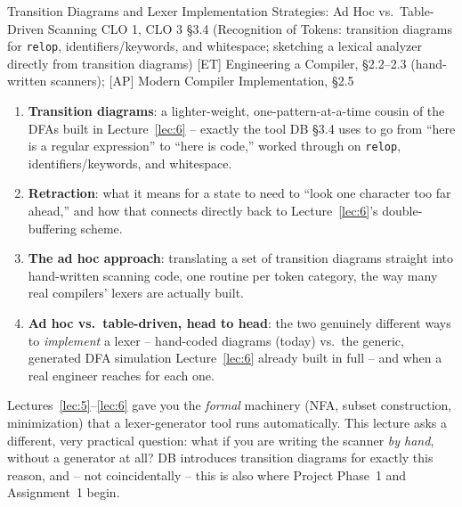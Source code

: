 \documentclass[full-course-notes.tex]{subfiles}
\begin{document}
  {Transition Diagrams and Lexer Implementation Strategies: Ad Hoc vs.\ Table-Driven Scanning}
  {CLO 1, CLO 3}
  {\S3.4 (Recognition of Tokens: transition diagrams for \texttt{relop}, identifiers/keywords,
   and whitespace; sketching a lexical analyzer directly from transition diagrams)}
  {[ET] Engineering a Compiler, \S2.2--2.3 (hand-written scanners); [AP] Modern Compiler
   Implementation, \S2.5}
\setcounter{section}{0}
\makelecturetitle


\begin{coreidea}
\begin{enumerate}
  \item \textbf{Transition diagrams}: a lighter-weight, one-pattern-at-a-time cousin of the
  DFAs built in Lecture~\ref{lec:6} -- exactly the tool DB \S3.4 uses to go from ``here is a
  regular expression'' to ``here is code,'' worked through on \texttt{relop}, identifiers/keywords,
  and whitespace.
  \item \textbf{Retraction}: what it means for a state to need to ``look one character too far
  ahead,'' and how that connects directly back to Lecture~\ref{lec:6}'s double-buffering
  scheme.
  \item \textbf{The ad hoc approach}: translating a set of transition diagrams straight into
  hand-written scanning code, one routine per token category, the way many real compilers'
  lexers are actually built.
  \item \textbf{Ad hoc vs.\ table-driven, head to head}: the two genuinely different ways to
  \emph{implement} a lexer -- hand-coded diagrams (today) vs.\ the generic, generated DFA
  simulation Lecture~\ref{lec:6} already built in full -- and when a real engineer reaches for
  each one.
\end{enumerate}
Lectures~\ref{lec:5}--\ref{lec:6} gave you the \emph{formal} machinery (NFA, subset
construction, minimization) that a lexer-generator tool runs automatically. This lecture asks a
different, very practical question: what if you are writing the scanner \emph{by hand}, without
a generator at all? DB introduces transition diagrams for exactly this reason, and -- not
coincidentally -- this is also where Project Phase~1 and Assignment~1 begin.
\end{coreidea}
\end{document}
